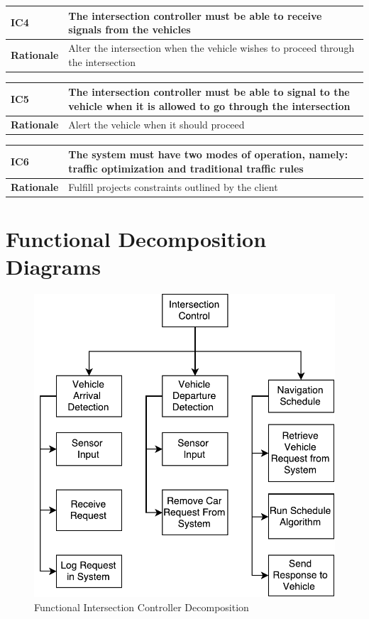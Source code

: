 \documentclass [11pt]{article}
\begin{document}
\begin{longtable}{| p{ } | p{ } | }\hline 
\rowcolor{tableCell}\textbf{IC4} & The intersection controller must be able to receive signals from the vehicles  \\ \hline
\textbf{Rationale} &  Alter the intersection when the vehicle wishes to proceed through the intersection\\ \hline 
\end{longtable}

\begin{longtable}{| p{ } | p{ } | }\hline 
\rowcolor{tableCell}\textbf{IC5} & The intersection controller must be able to signal to the vehicle when it is allowed to go through the intersection \\ \hline
\textbf{Rationale} &  Alert the vehicle when it should proceed\\ \hline 
\end{longtable}

\begin{longtable}{| p{ } | p{ } | }\hline 
\rowcolor{tableCell}\textbf{IC6} & The system must have two modes of operation, namely: traffic optimization and traditional traffic rules \\ \hline
\textbf{Rationale} & Fulfill projects constraints outlined by the client \\ \hline 
\end{longtable}



\section{Functional Decomposition Diagrams}
\begin{figure} [h!]
	\caption{Functional Intersection Controller Decomposition}\bigskip
	\centering
	\includegraphics [scale =.8] {figures/function_decomp_IC.pdf}
	
\end{figure}
\end{document}
